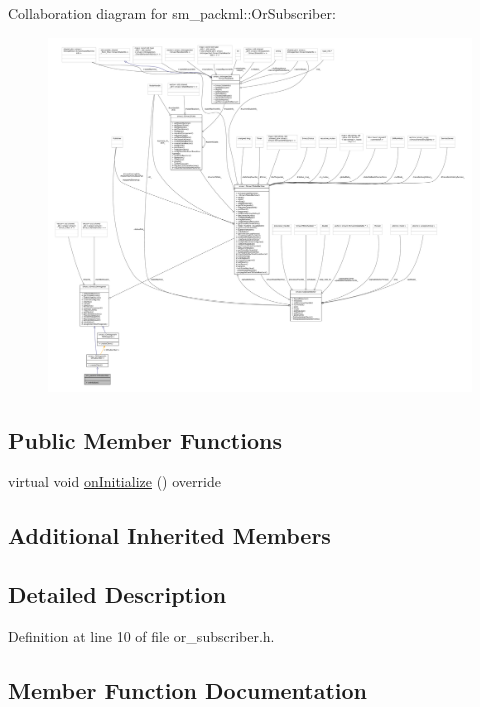 Collaboration diagram for sm\+\_\+packml\+:\+:Or\+Subscriber\+:
\nopagebreak
\begin{figure}[H]
\begin{center}
\leavevmode
\includegraphics[width=350pt]{classsm__packml_1_1OrSubscriber__coll__graph}
\end{center}
\end{figure}
\subsection*{Public Member Functions}
\begin{DoxyCompactItemize}
\item 
virtual void \hyperlink{classsm__packml_1_1OrSubscriber_a21c2958e73930f7260832656f664a769}{on\+Initialize} () override
\end{DoxyCompactItemize}
\subsection*{Additional Inherited Members}


\subsection{Detailed Description}


Definition at line 10 of file or\+\_\+subscriber.\+h.



\subsection{Member Function Documentation}

